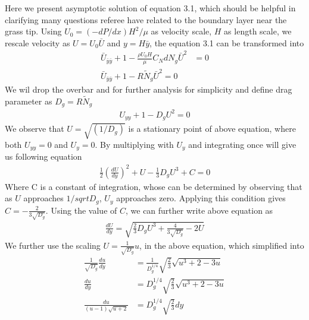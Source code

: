 \documentclass[letterpaper,10pt]{article}
\newcommand{\Ndg}{\tilde{N}_g}
\begin{document}
Here we present asymptotic solution of equation 3.1, which should be helpful in clarifying many questions referee have related to the boundary layer near the grass tip.
Using $ U_0 = (-dP/dx)H^2/\mu$ as velocity scale, $H$ as length scale, we rescale velocity as $U= U_0 \bar{U}$ and $y = H \bar{y}$, the equation 3.1 can be transformed into  
\begin{equation}
\begin{split}
 \bar{U}_{\bar{y}\bar{y}}+1 - \frac{\rho U_0 H}{\mu} C_N d N_g \bar{U}^2 &=0 \\
 \bar{U}_{\bar{y}\bar{y}}+1 - R \Ndg \bar{U}^2=0
\end{split}
\end{equation}
We wil drop the overbar and for further analysis for simplicity and define drag parameter as $D_g = R\Ndg$
\begin{equation}
\begin{split}
 {U}_{{y}{y}}+1 - D_g{U}^2=0
\end{split}
\end{equation}
We observe that $U = \sqrt{(1/D_g)}$ is a stationary point of above equation, where both $U_{yy}=0$ and $U_y =0 $. By multiplying with $U_y$ and integrating once will give us following equation
\begin{equation}
\begin{split}
 \frac{1}{2} \left( \frac{dU}{dy} \right)^2 +U - \frac{1}{3} D_g U^3 + C = 0
\end{split}
\end{equation}
Where C is a constant of integration, whose can be determined by observing that as $U$ approaches $1/sqrt{D_g}$, $U_y$ approaches zero. Applying this condition gives $C = -\frac{2}{3\sqrt{D_g}}$. Using the value of $C$, we can further write above equation as 
\begin{equation}
\begin{split}
 \frac{dU}{dy} = \sqrt{\frac{2}{3}D_g U^3+\frac{4}{3\sqrt{D_g}}-2U }
\end{split}
\end{equation}
We further use the scaling $U=\frac{1}{\sqrt{D_g}} u $, in the above equation, which simplified into 
\begin{equation}
\begin{split}
 \frac{1}{\sqrt{D_g}}\frac{du}{dy} &= \frac{1}{D_g^{1/4}}\sqrt{\frac{2}{3}} \sqrt{ u^3+2-3u } \\
 \frac{du}{dy} &= {D_g^{1/4}}\sqrt{\frac{2}{3}} \sqrt{ u^3+2-3u } \\
 \frac{du}{(u-1)\sqrt{u+2} } &= {D_g^{1/4}}\sqrt{\frac{2}{3}} dy
\end{split}
\end{equation}
\end{document}
